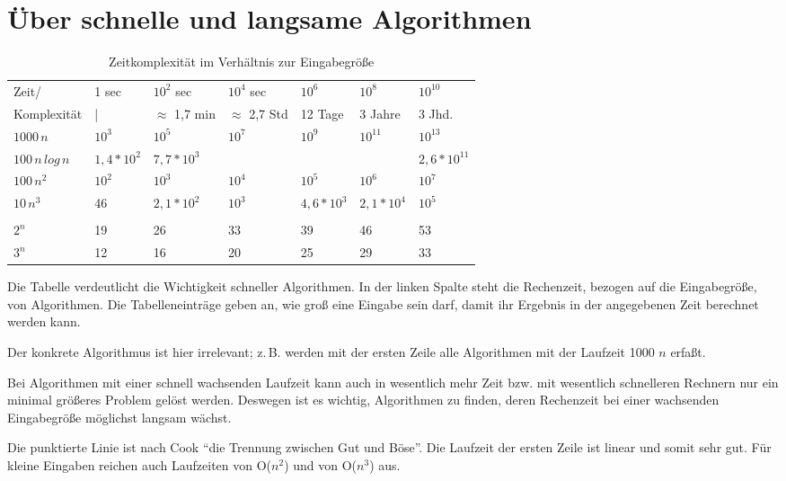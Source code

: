 \documentclass[ngerman]{scrreprt}%
\theoremstyle{break}
\begin{document}
\section{Über schnelle und langsame Algorithmen}
\begin{table}[h]
  \begin{tabular}{*{7}{|l}|}
    \hline
    Zeit/ & 1 sec & $10^2$ sec & $10^4$ sec & $10^6$ & $10^8$ & $10^{10}$ \\
    Komplexität & | & $\approx$ 1,7 min & $\approx$ 2,7 Std & 12 Tage & 3 Jahre & 3 Jhd.\\
    \hline
    $1000\,n$ & $10^3$ & $10^5$ & $10^7$ & $10^9$ & $10^{11}$ & $10^{13}$ \\
    $100\,n\,log\,n$ & $1,4*10^2$ & $7,7*10^3$ & & & & $2,6*10^{11}$ \\
    $100\,n^2$ & $10^2$ & $10^3$ & $10^4$ & $10^5$ & $10^6$ & $10^7$\\
    $10\,n^3$ & 46 & $2,1*10^2$ & $10^3$ & $4,6*10^3$ & $2,1*10^4$ & $10^5$ \\
    \\
    $2^n$ & 19 & 26 & 33 & 39 & 46 & 53\\
    $3^n$ & 12 & 16 & 20 & 25 & 29 & 33\\
    \hline
  \end{tabular}
  \caption{Zeitkomplexität im Verhältnis zur Eingabegröße}
\end{table}

Die Tabelle verdeutlicht die Wichtigkeit schneller Algorithmen. 
In der linken Spalte steht die Rechenzeit, bezogen auf die Eingabegröße, von Algorithmen. 
Die Tabelleneinträge geben an, wie groß eine Eingabe sein darf, damit ihr Ergebnis in der angegebenen Zeit berechnet werden kann. 

Der konkrete Algorithmus ist hier irrelevant; z.\,B. werden mit der ersten Zeile alle Algorithmen mit der Laufzeit 1000 $n$ erfaßt. 

Bei Algorithmen mit einer schnell wachsenden Laufzeit kann auch in wesentlich mehr Zeit bzw. mit wesentlich schnelleren Rechnern nur ein
minimal größeres Problem gelöst werden. Deswegen ist es wichtig, Algorithmen zu finden, deren Rechenzeit bei einer wachsenden
Eingabegröße möglichst langsam wächst.

Die punktierte Linie ist nach Cook "`die Trennung zwischen Gut und
Böse"'. Die Laufzeit der ersten Zeile ist linear und somit sehr gut.
Für kleine Eingaben reichen auch Laufzeiten von O($n^2$) und von O($n^3$) aus.
\end{document}
